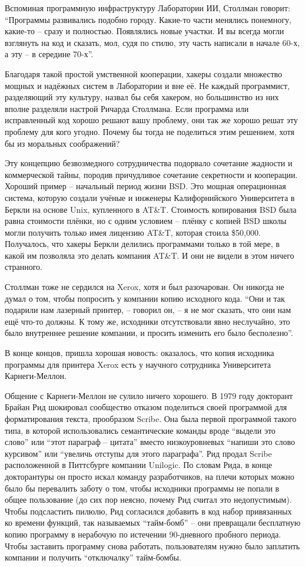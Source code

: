Вспоминая программную инфраструктуру Лаборатории ИИ, Столлман говорит: ``Программы развивались подобно городу. Какие-то части менялись понемногу, какие-то -- сразу и полностью. Появлялись новые участки. И вы всегда могли взглянуть на код и сказать, мол, судя по стилю, эту часть написали в начале 60-х, а эту -- в середине 70-х\hspace{0.01in}''.

Благодаря такой простой умственной кооперации, хакеры создали множество мощных и надёжных систем в Лаборатории и вне её. Не каждый программист, разделяющий эту культуру, назвал бы себя хакером, но большинство из них вполне разделяли настрой Ричарда Столлмана. Если программа или исправленный код хорошо решают вашу проблему, они так же хорошо решат эту проблему для кого угодно. Почему бы тогда не поделиться этим решением, хотя бы из моральных соображений?

Эту концепцию безвозмедного сотрудничества подорвало сочетание жадности и коммерческой тайны, породив причудливое сочетание секретности и кооперации. Хороший пример -- начальный период жизни BSD. Это мощная операционная система, которую создали учёные и инженеры Калифорнийского Университета в Беркли на основе Unix, купленного в AT\&T. Стоимость копирования BSD была равна стоимости плёнки, но с одним условием -- плёнку с копией BSD школы могли получить только имея лицензию AT\&T, которая стоила \$50,000. Получалось, что хакеры Беркли делились программами только в той мере, в какой им позволяла это делать компания AT\&T. И они не видели в этом ничего странного.

Столлман тоже не сердился на Xerox, хотя и был разочарован. Он никогда не думал о том, чтобы попросить у компании копию исходного кода. ``Они и так подарили нам лазерный принтер, -- говорил он, -- я не мог сказать, что они нам ещё что-то должны. К тому же, исходники отсутствовали явно неслучайно, это было внутреннее решение компании, и просить изменить его было бесполезно''.

В конце концов, пришла хорошая новость: оказалось, что копия исходника программы для принтера Xerox есть у научного сотрудника Университета Карнеги-Меллон.

Общение с Карнеги-Меллон не сулило ничего хорошего. В 1979 году докторант Брайан Рид шокировал сообщество отказом поделиться своей программой для форматирования текста, прообразом Scribe. Она была первой программой такого типа, в которой использовались семантические команды вроде ``выдели это слово'' или ``этот параграф -- цитата'' вместо низкоуровневых ``напиши это слово курсивом'' или ``увеличь отступы для этого параграфа''. Рид продал Scribe расположенной в Питтсбурге компании Unilogic. По словам Рида, в конце докторантуры он просто искал команду разработчиков, на плечи которых можно было бы перевалить заботу о том, чтобы исходники программы не попали в общее пользование (до сих пор неясно, почему Рид считал это недопустимым). Чтобы подсластить пилюлю, Рид согласился добавить в код набор привязанных ко времени функций, так называемых ``тайм-бомб'' -- они превращали бесплатную копию программу в нерабочую по истечении 90-дневного пробного периода. Чтобы заставить программу снова работать, пользователям нужно было заплатить компании и получить ``отключалку'' тайм-бомбы.

